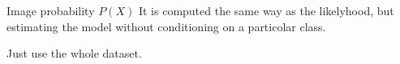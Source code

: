 \bgroup  
\begin{frame}{Image probability $P(X)$}
It is computed the same way as the likelyhood, but estimating the model without conditioning on a particolar class.

Just use the whole dataset.
\end{frame}
\egroup